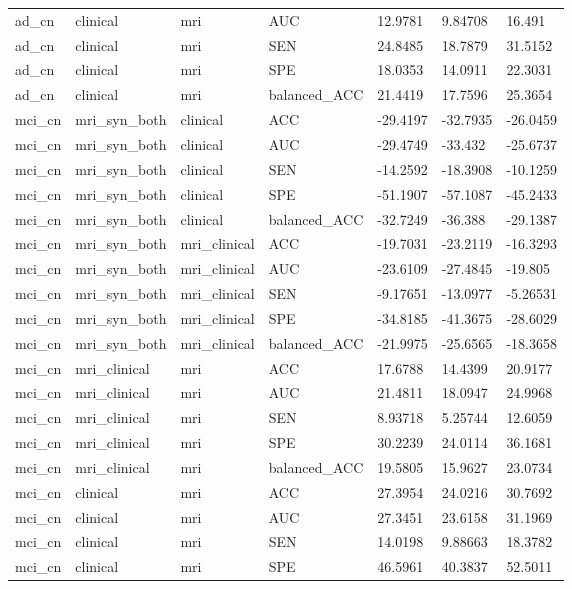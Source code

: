 \documentclass{article}
\begin{document}
\begin{landscape}
\begin{longtable}{lllllll}
ad\_cn & clinical & mri & AUC & 12.9781 & 9.84708 & 16.491 \\
ad\_cn & clinical & mri & SEN & 24.8485 & 18.7879 & 31.5152 \\
ad\_cn & clinical & mri & SPE & 18.0353 & 14.0911 & 22.3031 \\
ad\_cn & clinical & mri & balanced\_ACC & 21.4419 & 17.7596 & 25.3654 \\
mci\_cn & mri\_syn\_both & clinical & ACC & -29.4197 & -32.7935 & -26.0459 \\
mci\_cn & mri\_syn\_both & clinical & AUC & -29.4749 & -33.432 & -25.6737 \\
mci\_cn & mri\_syn\_both & clinical & SEN & -14.2592 & -18.3908 & -10.1259 \\
mci\_cn & mri\_syn\_both & clinical & SPE & -51.1907 & -57.1087 & -45.2433 \\
mci\_cn & mri\_syn\_both & clinical & balanced\_ACC & -32.7249 & -36.388 & -29.1387 \\
mci\_cn & mri\_syn\_both & mri\_clinical & ACC & -19.7031 & -23.2119 & -16.3293 \\
mci\_cn & mri\_syn\_both & mri\_clinical & AUC & -23.6109 & -27.4845 & -19.805 \\
mci\_cn & mri\_syn\_both & mri\_clinical & SEN & -9.17651 & -13.0977 & -5.26531 \\
mci\_cn & mri\_syn\_both & mri\_clinical & SPE & -34.8185 & -41.3675 & -28.6029 \\
mci\_cn & mri\_syn\_both & mri\_clinical & balanced\_ACC & -21.9975 & -25.6565 & -18.3658 \\
mci\_cn & mri\_clinical & mri & ACC & 17.6788 & 14.4399 & 20.9177 \\
mci\_cn & mri\_clinical & mri & AUC & 21.4811 & 18.0947 & 24.9968 \\
mci\_cn & mri\_clinical & mri & SEN & 8.93718 & 5.25744 & 12.6059 \\
mci\_cn & mri\_clinical & mri & SPE & 30.2239 & 24.0114 & 36.1681 \\
mci\_cn & mri\_clinical & mri & balanced\_ACC & 19.5805 & 15.9627 & 23.0734 \\
mci\_cn & clinical & mri & ACC & 27.3954 & 24.0216 & 30.7692 \\
mci\_cn & clinical & mri & AUC & 27.3451 & 23.6158 & 31.1969 \\
mci\_cn & clinical & mri & SEN & 14.0198 & 9.88663 & 18.3782 \\
mci\_cn & clinical & mri & SPE & 46.5961 & 40.3837 & 52.5011 \\

\end{longtable}
\end{landscape}
\end{document}
